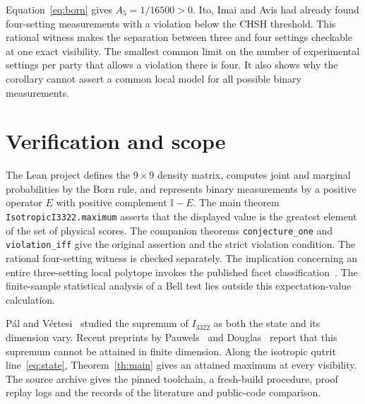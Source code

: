 \documentclass[11pt]{article}
\newcommand{\id}{\mathbb I}
\begin{document}
Equation~\eqref{eq:born} gives $A_5=1/16500>0$. Ito, Imai and Avis had already found four-setting measurements with a violation below the CHSH threshold. This rational witness makes the separation between three and four settings checkable at one exact visibility. The smallest common limit on the number of experimental settings per party that allows a violation there is four. It also shows why the corollary cannot assert a common local model for all possible binary measurements.

\section{Verification and scope}
The Lean project defines the $9\times9$ density matrix, computes joint and marginal probabilities by the Born rule, and represents binary measurements by a positive operator $E$ with positive complement $\id-E$. The main theorem \texttt{IsotropicI3322.maximum} asserts that the displayed value is the greatest element of the set of physical scores. The companion theorems \texttt{conjecture\_one} and \texttt{violation\_iff} give the original assertion and the strict violation condition. The rational four-setting witness is checked separately. The implication concerning an entire three-setting local polytope invokes the published facet classification~\cite{froissart,scarani}. The finite-sample statistical analysis of a Bell test lies outside this expectation-value calculation.

P\'al and V\'ertesi~\cite{pv} studied the supremum of $I_{3322}$ as both the state and its dimension vary. Recent preprints by Pauwels~\cite{pauwels} and Douglas~\cite{douglas} report that this supremum cannot be attained in finite dimension. Along the isotropic qutrit line~\eqref{eq:state}, Theorem~\ref{th:main} gives an attained maximum at every visibility. The source archive gives the pinned toolchain, a fresh-build procedure, proof replay logs and the records of the literature and public-code comparison.
\end{document}
